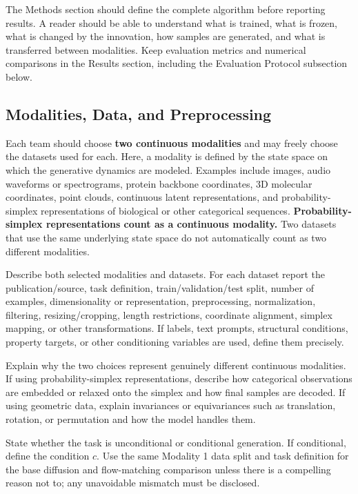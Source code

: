 \documentclass{article}
\begin{document}
The Methods section should define the complete algorithm before reporting results. A reader should be able to understand what is trained, what is frozen, what is changed by the innovation, how samples are generated, and what is transferred between modalities. Keep evaluation metrics and numerical comparisons in the Results section, including the Evaluation Protocol subsection below.

\subsection{Modalities, Data, and Preprocessing}

Each team should choose \textbf{two continuous modalities} and may freely choose the datasets used for each. Here, a modality is defined by the state space on which the generative dynamics are modeled. Examples include images, audio waveforms or spectrograms, protein backbone coordinates, 3D molecular coordinates, point clouds, continuous latent representations, and probability-simplex representations of biological or other categorical sequences. \textbf{Probability-simplex representations count as a continuous modality.} Two datasets that use the same underlying state space do not automatically count as two different modalities.

Describe both selected modalities and datasets. For each dataset report the publication/source, task definition, train/validation/test split, number of examples, dimensionality or representation, preprocessing, normalization, filtering, resizing/cropping, length restrictions, coordinate alignment, simplex mapping, or other transformations. If labels, text prompts, structural conditions, property targets, or other conditioning variables are used, define them precisely.

Explain why the two choices represent genuinely different continuous modalities. If using probability-simplex representations, describe how categorical observations are embedded or relaxed onto the simplex and how final samples are decoded. If using geometric data, explain invariances or equivariances such as translation, rotation, or permutation and how the model handles them.

State whether the task is unconditional or conditional generation. If conditional, define the condition $c$. Use the same Modality 1 data split and task definition for the base diffusion and flow-matching comparison unless there is a compelling reason not to; any unavoidable mismatch must be disclosed.
\end{document}
